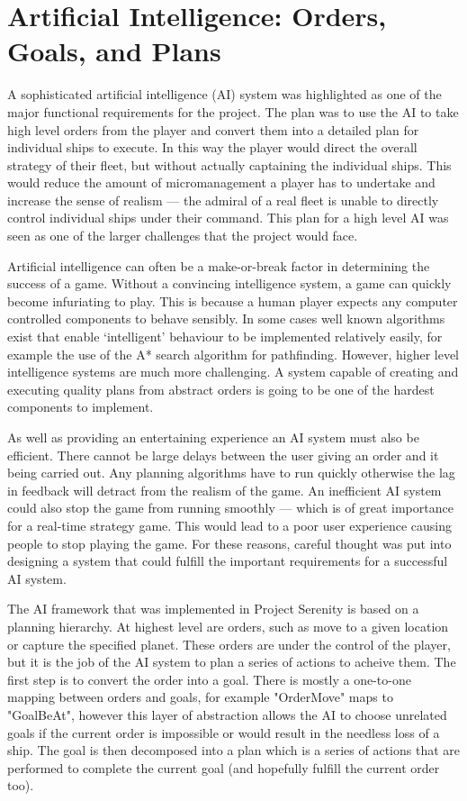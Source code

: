 \section{Artificial Intelligence: Orders, Goals, and Plans}

A sophisticated artificial intelligence (AI) system was highlighted as one of the major
functional requirements for the project. The plan was to use the AI to take high
level orders from the player and convert them into a detailed plan for individual
ships to execute. In this way the player would direct the overall strategy of their
fleet, but without actually captaining the individual ships. This would reduce the
amount of micromanagement a player has to undertake and increase the sense of realism
--- the admiral of a real fleet is unable to directly control individual ships under
their command. This plan for a high level AI was seen as one of the larger challenges
that the project would face.

Artificial intelligence can often be a make-or-break factor in determining the success of
a game. Without a convincing intelligence system, a game can
quickly become infuriating to play. This is because a human player expects any computer
controlled components to behave sensibly. In some cases well known algorithms exist that
enable `intelligent' behaviour to be implemented relatively easily, for example the use
of the A* search algorithm for pathfinding. However, higher level intelligence systems
are much more challenging. A system capable of creating and executing quality plans
from abstract orders is going to be one of the hardest components to implement.

As well as providing an entertaining experience an AI system must also be efficient.
There cannot be large delays between the user giving an order and it being carried
out. Any planning algorithms have to run quickly otherwise the lag in feedback will
detract from the realism of the game. An inefficient AI system could also stop the game
from running smoothly --- which is of great importance for a real-time strategy game.
This would lead to a poor user experience causing people to stop playing the game.
For these reasons, careful thought was put into designing a system that could fulfill
the important requirements for a successful AI system.

The AI framework that was implemented in Project Serenity is based on a planning
hierarchy. At highest level are orders, such as move to a given location or capture
the specified planet. These orders are under the control of the player, but it is
the job of the AI system to plan a series of actions to acheive them. The first step
is to convert the order into a goal. There is mostly a one-to-one mapping between
orders and goals, for example "OrderMove" maps to "GoalBeAt", however this layer of
abstraction allows the AI to choose unrelated goals if the current order is impossible
or would result in the needless loss of a ship. The goal is then decomposed into a
plan which is a series of actions that are performed to complete the current goal
(and hopefully fulfill the current order too).

